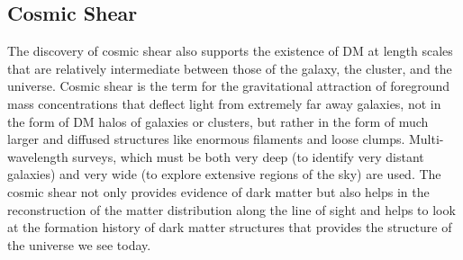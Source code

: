 \subsection{Cosmic Shear}
\hspace{0.5cm}The discovery of cosmic shear also supports the existence of DM at length scales that are relatively intermediate between those of the galaxy, the cluster, and the universe. Cosmic shear is the term for the gravitational attraction of foreground mass concentrations that deflect light from extremely far away galaxies, not in the form of DM halos of galaxies or clusters, but rather in the form of much larger and diffused structures like enormous filaments and loose clumps. Multi-wavelength surveys, which must be both very deep (to identify very distant galaxies) and very wide (to explore extensive regions of the sky) are used. The cosmic shear not only provides evidence of dark matter but also helps in the reconstruction of the matter distribution along the line of sight and helps to look at the formation history of dark matter structures that provides the structure of the universe we see today.




